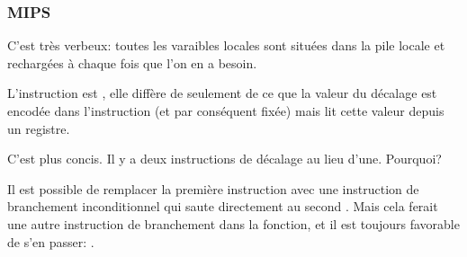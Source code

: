 \subsubsection{MIPS}





C'est très verbeux: toutes les varaibles locales sont situées dans la pile locale
et rechargées à chaque fois que l'on en a besoin.

L'instruction \SLLV est , elle diffère de \SLL
seulement de ce que la valeur du décalage est encodée dans l'instruction \SLL (et
par conséquent fixée) mais \SLLV lit cette valeur depuis un registre.


C'est plus concis.
Il y a deux instructions de décalage au lieu d'une.
Pourquoi?

Il est possible de remplacer la première instruction \SLLV avec une instruction de
branchement inconditionnel qui saute directement au second \SLLV.
Mais cela ferait une autre instruction de branchement dans la fonction, et il est
toujours favorable de s'en passer: .



